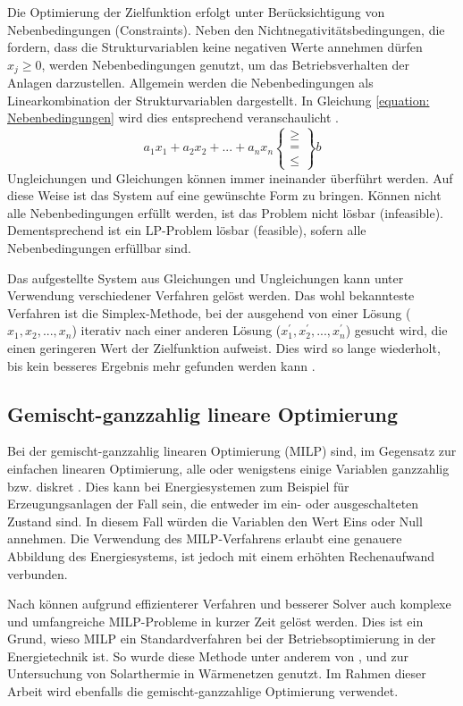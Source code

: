 Die Optimierung der Zielfunktion erfolgt unter Berücksichtigung von Nebenbedingungen (Constraints). Neben den Nichtnegativitätsbedingungen, die fordern, dass die Strukturvariablen keine negativen Werte annehmen dürfen $x_j \geq 0$, werden Nebenbedingungen genutzt, um das Betriebsverhalten der Anlagen darzustellen. Allgemein werden die Nebenbedingungen als Linearkombination der Strukturvariablen dargestellt. In Gleichung \ref{equation: Nebenbedingungen} wird dies entsprechend veranschaulicht \cite{Vanderbei2014}.
	\begin{equation}\label{equation: Nebenbedingungen}
		a_1x_1 + a_2x_2 + ... +  a_nx_n \begin{Bmatrix}\geq\\=\\\leq\end{Bmatrix} b
	\end{equation} 
Ungleichungen und Gleichungen können immer ineinander überführt werden. Auf diese Weise ist das System auf eine gewünschte Form zu bringen. Können nicht alle Nebenbedingungen erfüllt werden, ist das Problem nicht lösbar (infeasible). Dementsprechend ist ein \ac{LP}-Problem lösbar (feasible), sofern alle Nebenbedingungen erfüllbar sind.

Das aufgestellte System aus Gleichungen und Ungleichungen kann unter Verwendung verschiedener Verfahren gelöst werden. Das wohl bekannteste Verfahren ist die Simplex-Methode, bei der ausgehend von einer Lösung ($x_1, x_2, ..., x_n$) iterativ nach einer anderen Lösung ($x_1^{'}, x_2^{'}, ..., x_n^{'}$) gesucht wird, die einen geringeren Wert der Zielfunktion aufweist. Dies wird so lange wiederholt, bis kein besseres Ergebnis mehr gefunden werden kann \cite{Vanderbei2014}. 

\subsection{Gemischt-ganzzahlig lineare Optimierung}
Bei der gemischt-ganzzahlig linearen Optimierung (\ac{MILP}) sind, im Gegensatz zur einfachen linearen Optimierung, alle oder wenigstens einige Variablen ganzzahlig bzw. diskret \cite{Kallrath2013}. Dies kann bei Energiesystemen zum Beispiel für Erzeugungsanlagen der Fall sein, die entweder im ein- oder ausgeschalteten Zustand sind. In diesem Fall würden die Variablen den Wert Eins oder Null annehmen. Die Verwendung des \ac{MILP}-Verfahrens erlaubt eine genauere Abbildung des Energiesystems, ist jedoch mit einem erhöhten Rechenaufwand verbunden.

Nach \citet{Kallrath2013} können aufgrund effizienterer Verfahren und besserer Solver auch komplexe und umfangreiche \ac{MILP}-Probleme in kurzer Zeit gelöst werden. Dies ist ein Grund, wieso \ac{MILP} ein Standardverfahren bei der Betriebsoptimierung in der Energietechnik ist. So wurde diese Methode unter anderem von \citet{HAIKARAINEN2014211}, \citet{GABRIELLI2018408} und \citet{MORVAJ2016619} zur Untersuchung von Solarthermie in Wärmenetzen genutzt. Im Rahmen dieser Arbeit wird ebenfalls die gemischt-ganzzahlige Optimierung verwendet.

